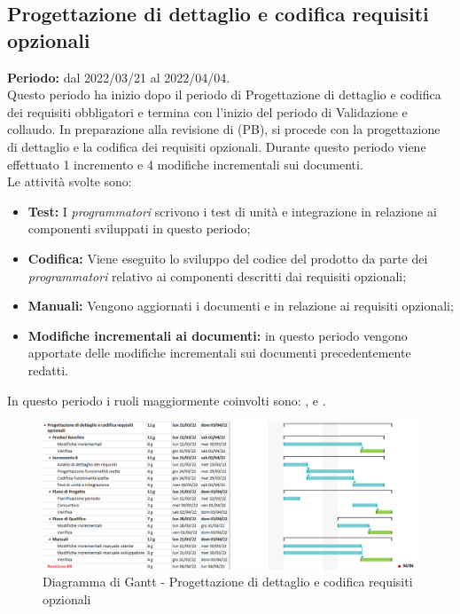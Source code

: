 \subsection{Progettazione di dettaglio e codifica requisiti opzionali} \label{subsection:pianificazione_requisiti_opzionali}
\textbf{Periodo:} dal 2022/03/21 al 2022/04/04.
\bigskip
\\Questo periodo ha inizio dopo il periodo di Progettazione di dettaglio e codifica dei requisiti obbligatori e termina con l'inizio del periodo di Validazione e collaudo.
In preparazione alla revisione di \PB{} (PB\glo{}), si procede con la progettazione di dettaglio e la codifica dei requisiti opzionali.
Durante questo periodo viene effettuato 1 incremento e 4 modifiche incrementali sui documenti. 
\\Le attività svolte sono:
\begin{itemize}
  \item \textbf{Test:} I \textit{programmatori} scrivono i test di unità e integrazione in relazione ai componenti sviluppati in questo periodo;
  \item \textbf{Codifica:} Viene eseguito lo sviluppo del codice del prodotto da parte dei \textit{programmatori} relativo ai componenti descritti dai requisiti opzionali;
  \item \textbf{Manuali:} Vengono aggiornati i documenti \docNameVersionMU{} e \docNameVersionMS{} in relazione ai requisiti opzionali;
  \item \textbf{Modifiche incrementali ai documenti:} in questo periodo vengono apportate delle modifiche incrementali sui documenti precedentemente redatti.
 \end{itemize}
 In questo periodo i ruoli maggiormente coinvolti sono: \roleDesignerLow{}, \roleProgrammerLow{} e \roleVerifierLow{}.
 \bigskip
 \begin{figure}[H]
  \centering
   \includegraphics[scale=0.56]{immagini/prog_requisiti_opzionali.png}
   \caption{Diagramma di Gantt - Progettazione di dettaglio e codifica requisiti opzionali}
  \end{figure}
  \pagebreak

